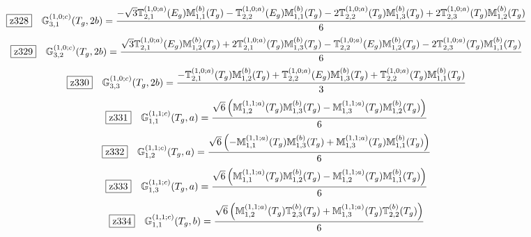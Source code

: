 \documentclass[fleqn,10pt,landscape]{jsarticle}
\begin{document}
\begin{dmath*}
\hspace*{3mm}\fbox{z328}\quad \mathbb{G}_{3,1}^{(1,0;c)}(T_{g},2b)=\frac{- \sqrt{3} \mathbb{T}_{2,1}^{(1,0;a)}(E_{g}) \mathbb{M}_{1,1}^{(b)}(T_{g}) - \mathbb{T}_{2,2}^{(1,0;a)}(E_{g}) \mathbb{M}_{1,1}^{(b)}(T_{g}) - 2 \mathbb{T}_{2,2}^{(1,0;a)}(T_{g}) \mathbb{M}_{1,3}^{(b)}(T_{g}) + 2 \mathbb{T}_{2,3}^{(1,0;a)}(T_{g}) \mathbb{M}_{1,2}^{(b)}(T_{g})}{6}
\end{dmath*}
\begin{dmath*}
\hspace*{3mm}\fbox{z329}\quad \mathbb{G}_{3,2}^{(1,0;c)}(T_{g},2b)=\frac{\sqrt{3} \mathbb{T}_{2,1}^{(1,0;a)}(E_{g}) \mathbb{M}_{1,2}^{(b)}(T_{g}) + 2 \mathbb{T}_{2,1}^{(1,0;a)}(T_{g}) \mathbb{M}_{1,3}^{(b)}(T_{g}) - \mathbb{T}_{2,2}^{(1,0;a)}(E_{g}) \mathbb{M}_{1,2}^{(b)}(T_{g}) - 2 \mathbb{T}_{2,3}^{(1,0;a)}(T_{g}) \mathbb{M}_{1,1}^{(b)}(T_{g})}{6}
\end{dmath*}
\begin{dmath*}
\hspace*{3mm}\fbox{z330}\quad \mathbb{G}_{3,3}^{(1,0;c)}(T_{g},2b)=\frac{- \mathbb{T}_{2,1}^{(1,0;a)}(T_{g}) \mathbb{M}_{1,2}^{(b)}(T_{g}) + \mathbb{T}_{2,2}^{(1,0;a)}(E_{g}) \mathbb{M}_{1,3}^{(b)}(T_{g}) + \mathbb{T}_{2,2}^{(1,0;a)}(T_{g}) \mathbb{M}_{1,1}^{(b)}(T_{g})}{3}
\end{dmath*}
\begin{dmath*}
\hspace*{3mm}\fbox{z331}\quad \mathbb{G}_{1,1}^{(1,1;c)}(T_{g},a)=\frac{\sqrt{6} \left(\mathbb{M}_{1,2}^{(1,1;a)}(T_{g}) \mathbb{M}_{1,3}^{(b)}(T_{g}) - \mathbb{M}_{1,3}^{(1,1;a)}(T_{g}) \mathbb{M}_{1,2}^{(b)}(T_{g})\right)}{6}
\end{dmath*}
\begin{dmath*}
\hspace*{3mm}\fbox{z332}\quad \mathbb{G}_{1,2}^{(1,1;c)}(T_{g},a)=\frac{\sqrt{6} \left(- \mathbb{M}_{1,1}^{(1,1;a)}(T_{g}) \mathbb{M}_{1,3}^{(b)}(T_{g}) + \mathbb{M}_{1,3}^{(1,1;a)}(T_{g}) \mathbb{M}_{1,1}^{(b)}(T_{g})\right)}{6}
\end{dmath*}
\begin{dmath*}
\hspace*{3mm}\fbox{z333}\quad \mathbb{G}_{1,3}^{(1,1;c)}(T_{g},a)=\frac{\sqrt{6} \left(\mathbb{M}_{1,1}^{(1,1;a)}(T_{g}) \mathbb{M}_{1,2}^{(b)}(T_{g}) - \mathbb{M}_{1,2}^{(1,1;a)}(T_{g}) \mathbb{M}_{1,1}^{(b)}(T_{g})\right)}{6}
\end{dmath*}
\begin{dmath*}
\hspace*{3mm}\fbox{z334}\quad \mathbb{G}_{1,1}^{(1,1;c)}(T_{g},b)=\frac{\sqrt{6} \left(\mathbb{M}_{1,2}^{(1,1;a)}(T_{g}) \mathbb{T}_{2,3}^{(b)}(T_{g}) + \mathbb{M}_{1,3}^{(1,1;a)}(T_{g}) \mathbb{T}_{2,2}^{(b)}(T_{g})\right)}{6}
\end{dmath*}
\end{document}
